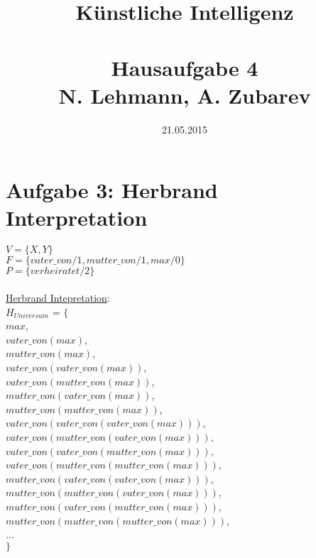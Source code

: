 \documentclass{article}
\title{Künstliche Intelligenz\\~\\Hausaufgabe 4\\ \small{N. Lehmann, A. Zubarev}}
\date{21.05.2015}
\begin{document}
\maketitle



\newpage

\section*{Aufgabe 3: Herbrand Interpretation}

$V = \{X,Y\}$\\
$F = \{vater\_von/1, mutter\_von/1, max/0\}$\\
$P = \{verheiratet/2 \}$\\
\\
\underline{Herbrand Intepretation}:\\

$H_{Universum}$ = $\{$\\
$max$,\\
$vater\_von(max)$,\\
$mutter\_von(max)$,\\
$vater\_von(vater\_von(max))$,\\
$vater\_von(mutter\_von(max))$,\\
$mutter\_von(vater\_von(max))$,\\
$mutter\_von(mutter\_von(max))$,\\
$vater\_von(vater\_von(vater\_von(max)))$,\\
$vater\_von(mutter\_von(vater\_von(max)))$,\\
$vater\_von(vater\_von(mutter\_von(max)))$,\\
$vater\_von(mutter\_von(mutter\_von(max)))$,\\
$mutter\_von(vater\_von(vater\_von(max)))$,\\
$mutter\_von(mutter\_von(vater\_von(max)))$,\\
$mutter\_von(vater\_von(mutter\_von(max)))$,\\
$mutter\_von(mutter\_von(mutter\_von(max)))$,\\
...\\
$\}$

\newpage
\end{document}
